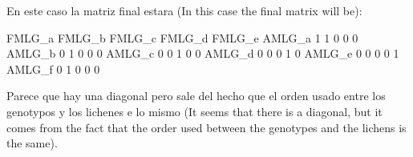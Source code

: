 En este caso la matriz final estara (In this case the final matrix will be):

	FMLG_a	FMLG_b	FMLG_c	FMLG_d	FMLG_e
AMLG_a	1	1	0	0	0	
AMLG_b	0	1	0	0	0
AMLG_c	0	0	1	0	0
AMLG_d	0	0	0	1	0
AMLG_e	0	0	0	0	1
AMLG_f	0	1	0	0	0


Parece que hay una diagonal pero sale del hecho que el orden usado entre los genotypos y los lichenes e lo mismo (It seems that there is a diagonal, but it comes from the fact that the order used between the genotypes and the lichens is the same). 

